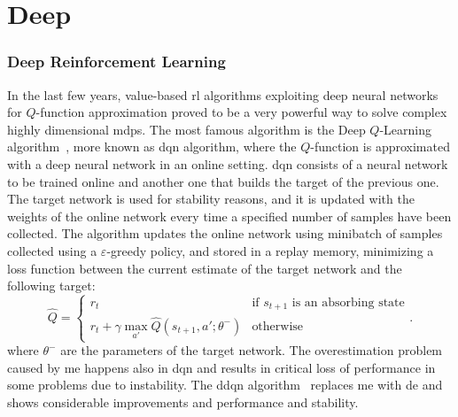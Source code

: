 \chapter{Deep}

\subsection{Deep Reinforcement Learning}\label{S:WDQN}
In the last few years, value-based \gls{rl} algorithms exploiting deep neural networks for $Q$-function approximation proved to be a very powerful way to solve complex highly dimensional \glspl{mdp}. The most famous algorithm is the Deep $Q$-Learning algorithm~\cite{mnih2015human}, more known as \gls{dqn} algorithm, where the $Q$-function is approximated with a deep neural network in an online setting. \gls{dqn} consists of a neural network to be trained online and another one that builds the target of the previous one. The target network is used for stability reasons, and it is updated with the weights of the online network every time a specified number of samples have been collected. The algorithm updates the online network using minibatch of samples collected using a $\varepsilon$-greedy policy, and stored in a replay memory, minimizing a loss function between the current estimate of the target network and the following target:
$$\hat{Q} =
  \begin{cases}
    r_t & \text{if $s_{t+1}$ is an absorbing state} \\
    r_t + \gamma \max_{a'} \hat{Q}(s_{t+1}, a'; \theta^-) & \text{otherwise}
  \end{cases}.
$$
where $\theta^-$ are the parameters of the target network. The overestimation problem caused by \gls{me} happens also in \gls{dqn} and results in critical loss of performance in some problems due to instability. The \gls{ddqn} algorithm~\cite{hasselt2015double} replaces \gls{me} with \gls{de} and shows considerable improvements and performance and stability.

